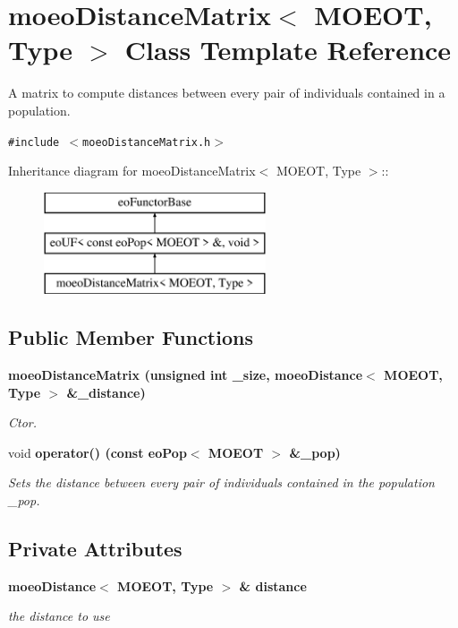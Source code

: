 \section{moeo\-Distance\-Matrix$<$ MOEOT, Type $>$ Class Template Reference}
\label{classmoeoDistanceMatrix}
A matrix to compute distances between every pair of individuals contained in a population.  


{\tt \#include $<$moeo\-Distance\-Matrix.h$>$}

Inheritance diagram for moeo\-Distance\-Matrix$<$ MOEOT, Type $>$::\begin{figure}[H]
\begin{center}
\leavevmode
\includegraphics[height=3cm]{classmoeoDistanceMatrix}
\end{center}
\end{figure}
\subsection*{Public Member Functions}
\begin{CompactItemize}
\item 
\bf{moeo\-Distance\-Matrix} (unsigned int \_\-size, \bf{moeo\-Distance}$<$ MOEOT, Type $>$ \&\_\-distance)
\begin{CompactList}\small\item\em Ctor. \item\end{CompactList}\item 
void \bf{operator()} (const \bf{eo\-Pop}$<$ MOEOT $>$ \&\_\-pop)
\begin{CompactList}\small\item\em Sets the distance between every pair of individuals contained in the population \_\-pop. \item\end{CompactList}\end{CompactItemize}
\subsection*{Private Attributes}
\begin{CompactItemize}
\item 
\bf{moeo\-Distance}$<$ MOEOT, Type $>$ \& \bf{distance}\label{classmoeoDistanceMatrix_72789ab7bcb89670cdc4242173dc2c69}

\begin{CompactList}\small\item\em the distance to use \item\end{CompactList}\end{CompactItemize}


